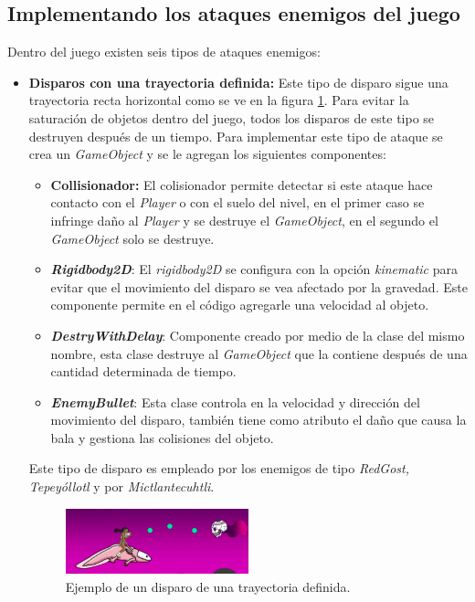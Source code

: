 \subsection{Implementando los ataques enemigos del juego}
Dentro del juego existen seis tipos de ataques enemigos:
    \begin{itemize}
        \item \textbf{Disparos con una trayectoria definida:} Este tipo de
        disparo sigue una trayectoria recta horizontal como se ve en la figura         
        \ref{fig:Enemyshot}.
        Para evitar la saturación de objetos dentro del juego, todos los disparos de
        este tipo se destruyen después de un tiempo. Para implementar este tipo de
        ataque se crea un \textit{GameObject} y se le agregan los siguientes
        componentes:
            \begin{itemize}
                \item \textbf{Collisionador:} El colisionador permite detectar si este
                ataque hace contacto con el \textit{Player} o con el suelo del nivel,
                en el primer caso se infringe daño al \textit{Player} y se destruye el
                \textit{GameObject}, en el segundo el \textit{GameObject} solo se
                destruye.
                \item \textbf{\textit{Rigidbody2D}}: El \textit{rigidbody2D} se
                configura
                con la opción \textit{kinematic} para evitar que el movimiento del
                disparo se vea afectado por la gravedad. Este componente permite en el
                código agregarle una velocidad al objeto.
                \item \textbf{\textit{DestryWithDelay}}: Componente creado por medio de
                la clase del mismo nombre, esta clase destruye al \textit{GameObject}
                que la contiene después de una cantidad determinada de tiempo.
                \item \textbf{\textit{EnemyBullet}}: Esta clase controla en la velocidad
                y dirección del movimiento del disparo, también tiene como atributo el
                daño que causa la bala y gestiona las colisiones del objeto.
            \end{itemize}
        Este tipo de disparo es empleado por los enemigos de tipo \textit{RedGost,
        Tepeyóllotl} y por \textit{Mictlantecuhtli}.
            
            \begin{figure}[h]
                \centering
                \includegraphics[width=0.5\textwidth]{03TrabajoRealizado/imagenes/disparoTrayectoria.png}
                \caption{Ejemplo de un disparo de una trayectoria definida.}
                \label{fig:Enemyshot}
            \end{figure}
            

\end{itemize}
